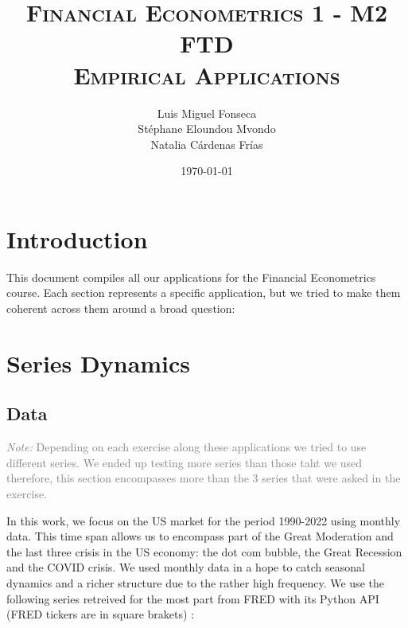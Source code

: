\documentclass[hidelinks,12pts]{article}
\DeclareMathOperator{\1}{\mathbbm{1}}
\begin{document}
        \title{\scshape{Financial Econometrics 1 - M2 FTD \\ Empirical Applications}}
        \author{Luis Miguel Fonseca \\ Stéphane Eloundou Mvondo\\ Natalia Cárdenas Frías }
        \date{\today}
        \maketitle 

\tableofcontents
\newpage


\section*{Introduction} 

This document compiles all our applications for the Financial Econometrics course. 
Each section represents a specific application, but we tried to make them coherent across them around a broad question: 





\section{Series Dynamics}\label{sec:dynamics}

\subsection{Data}
\textcolor{gray}{\emph{Note:} Depending on each exercise along these applications we tried to use different series. We ended up testing more series than those taht we used therefore, this section encompasses more than the 3 series that were asked in the exercise.}

In this work, we focus on the US market for the period 1990-2022 using monthly data. 
This time span allows us to encompass part of the Great Moderation and the last three crisis in the US economy: the dot com bubble, the Great Recession and the COVID crisis. 
We used monthly data in a hope to catch seasonal dynamics and a richer structure due to the rather high frequency.
We use the following series retreived for the most part from FRED with its Python API (FRED tickers are in square brakets) : 
\end{document}
